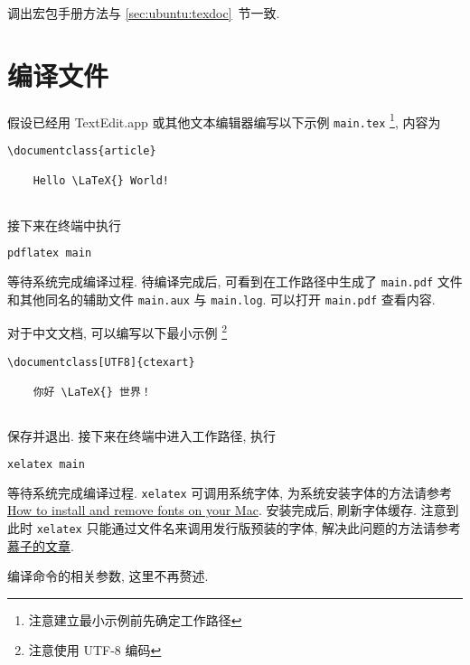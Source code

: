 调出宏包手册方法与 \ref{sec:ubuntu:texdoc}~节一致.

\section{编译文件}

假设已经用 TextEdit.app 或其他文本编辑器编写以下示例 \texttt{main.tex}%
\footnote{注意建立最小示例前先确定工作路径},
内容为
\begin{lstlisting}[language = {[LaTeX]TeX}]
  \documentclass{article}
  
    Hello \LaTeX{} World!
  
\end{lstlisting}
接下来在\textsf{终端}中执行
\begin{lstlisting}[language=bash]
  pdflatex main
\end{lstlisting}
等待系统完成编译过程. 
待编译完成后, 可看到在工作路径中生成了 \texttt{main.pdf}
文件和其他同名的辅助文件 \texttt{main.aux} 与 \texttt{main.log}.
可以打开 \texttt{main.pdf} 查看内容.

对于中文文档, 可以编写以下最小示例%
\footnote{注意使用 UTF-8 编码}%
\begin{lstlisting}[language={[LaTeX]TeX}]
  \documentclass[UTF8]{ctexart}
  
    你好 \LaTeX{} 世界！
  
\end{lstlisting}
保存并退出.
接下来在\textsf{终端}中进入工作路径,
执行
\begin{lstlisting}[language=bash]
  xelatex main
\end{lstlisting}
等待系统完成编译过程.
\texttt{xelatex} 可调用系统字体,
为系统安装字体的方法请参考
\href{https://support.apple.com/en-us/HT201749}{How to install and remove fonts on your Mac}.
安装完成后, 刷新字体缓存.
注意到此时 \texttt{xelatex} 只能通过文件名来调用发行版预装的字体,
解决此问题的方法请参考%
\href{https://zhuanlan.zhihu.com/p/59774395}{慕子的文章}.

编译命令的相关参数, 这里不再赘述.
